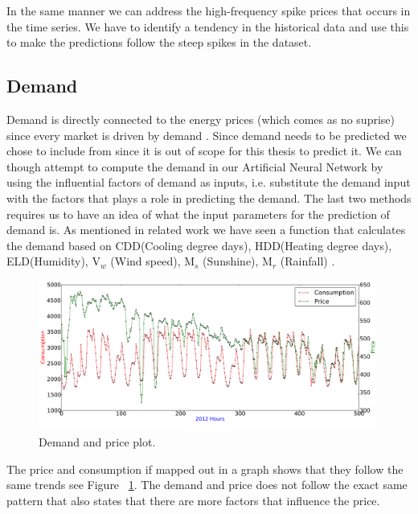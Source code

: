 In the same manner we can address the high-frequency spike prices that occurs in the time series. We have to identify a tendency in the historical data and use this to make the predictions follow the steep spikes in the dataset.

\subsection{Demand}
Demand is directly connected to the energy prices (which comes as no suprise) since every market is driven by demand \cite{singhal2011electricity}. Since demand needs to be predicted we chose to include from  since it is out of scope for this thesis to predict it. We can though attempt to compute the demand in our Artificial Neural Network by using the influential factors of demand as inputs, i.e. substitute the demand input with the factors that plays a role in predicting the demand. The last two methods requires us to have an idea of what the input parameters for the prediction of demand is. As mentioned in related work we have seen a function that calculates the demand based on CDD(Cooling degree days), HDD(Heating degree days), ELD(Humidity), V$_w$ (Wind speed), M$_s$ (Sunshine), M$_r$ (Rainfall) \cite{19}.

\begin{figure}[H]
\centering
\includegraphics[width=0.99\textwidth ]{billeder/energy_price_plots/price_consump_graph.png}
\caption{Demand and price plot.}
\label{fig:consump_price_graph}
\end{figure}

The price and consumption if mapped out in a graph shows that they follow the same trends see Figure ~\ref{fig:consump_price_graph}. The demand and price does not follow the exact same pattern that also states that there are more factors that influence the price.

